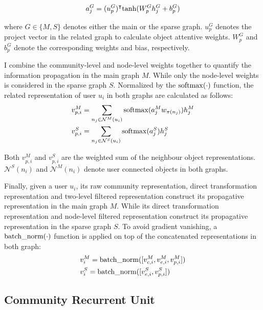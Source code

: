\begin{equation} \label{eq:np}
a_{j}^{G} = (u_p^{G})^{\intercal} {\rm tanh}(W^{G}_p h_{j}^{G} +b_p^{G})
\end{equation}

where $G \in\{M,S\}$ denotes either the main or the sparse graph. $u^{G}_p$ denotes the project vector in the related graph to calculate object attentive weights. $W_p^{G}$ and $b_p^{G}$ denote the corresponding weights and bias, respectively. 

I combine the community-level and node-level weights together to quantify the information propagation in the main graph $M$. While only the node-level weights is considered in the sparse graph $S$. Normalized by the ${\rm softmax}(\cdot)$ function, the related representation of  user $u_i$ in both graphs are calculated as follows:
\begin{equation}\label{eq:pv}
\begin{aligned} 
& v_{p,i}^{M} = \sum_{n_j \in \mathcal{N}^{M}(u_i)} {\rm softmax}(a_{j}^{M} w_{\pi(n_j)})  h_{j}^{M} \\
& v_{p,i}^{S} = \sum_{n_j \in \mathcal{N}^{S}(u_i)}{\rm softmax}(a_{j}^{S}) h_{j}^{S} 
\end{aligned} 
\end{equation}

Both $v_{p,i}^{M}$ and $v_{p,i}^{S}$ are the weighted sum of the neighbour object representations. $\mathcal{N}^{S}(n_i)$ and $\mathcal{N}^{M}(n_i)$ denote user connected objects in both graphs. 

Finally, given a user $u_i$, its raw community representation, direct transformation representation and two-level filtered representation construct its propagative representation in the main graph $M$. While its direct transformation representation and node-level filtered representation construct its propagative representation in the sparse graph $S$. To avoid gradient vanishing, a ${\rm batch\_norm(\cdot)}$ function is applied on top of the concatenated representations in both graph:
\begin{equation} \label{eq:nv}
\begin{aligned} 
& v_{i}^{M} = {\rm batch\_norm}([v_{c,i}^{M},v_{e,i}^{M},v_{p,i}^{M}]) \\
& v_{i}^{S} = {\rm batch\_norm}( [v_{e,i}^{S},v_{p,i}^{S}])
\end{aligned} 
\end{equation} 

\subsection{Community Recurrent Unit}\label{sc:cru}

